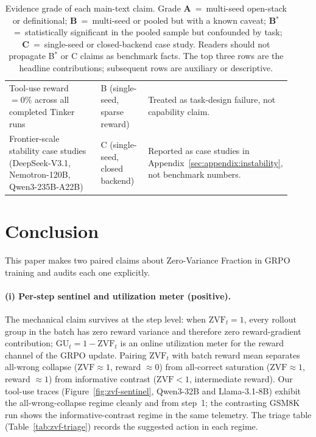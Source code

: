 \documentclass{article}
\begin{document}
\begin{table}[htbp]
\begin{tabular}{p{0.42\linewidth}p{0.18\linewidth}p{0.32\linewidth}}
Tool-use reward $=0\%$ across all completed Tinker runs &
B (single-seed, sparse reward) &
Treated as task-design failure, not capability claim. \\
Frontier-scale stability case studies (DeepSeek-V3.1, Nemotron-120B,
Qwen3-235B-A22B) &
C (single-seed, closed backend) &
Reported as case studies in
Appendix~\ref{sec:appendix:instability}, not benchmark numbers. \\
\bottomrule
\end{tabular}
\caption{Evidence grade of each main-text claim. Grade
\textbf{A}~=~multi-seed open-stack or definitional; \textbf{B}~=~multi-seed
or pooled but with a known caveat; \textbf{B$^{*}$}~=~statistically
significant in the pooled sample but confounded by task; \textbf{C}~=~single-seed
or closed-backend case study. Readers should not propagate B$^{*}$ or C
claims as benchmark facts. The top three rows are the headline contributions;
subsequent rows are auxiliary or descriptive.}
\label{tab:evidence-grade}
\end{table}

\section{Conclusion}
\label{sec:conclusion}

This paper makes two paired claims about Zero-Variance Fraction in GRPO
training and audits each one explicitly.

\paragraph{(i) Per-step sentinel and utilization meter (positive).}
The mechanical claim survives at the step level: when $\mathrm{ZVF}_t = 1$,
every rollout group in the batch has zero reward variance and therefore
zero reward-gradient contribution; $\mathrm{GU}_t = 1-\mathrm{ZVF}_t$ is an
online utilization meter for the reward channel of the GRPO update.
Pairing $\mathrm{ZVF}_t$ with batch reward mean separates all-wrong
collapse ($\mathrm{ZVF}{\approx}1$, reward $\approx 0$) from all-correct
saturation ($\mathrm{ZVF}{\approx}1$, reward $\approx 1$) from informative
contrast ($\mathrm{ZVF}{<}1$, intermediate reward). Our tool-use traces
(Figure~\ref{fig:zvf-sentinel}, Qwen3-32B and Llama-3.1-8B) exhibit the
all-wrong-collapse regime cleanly and from step~1; the contrasting GSM8K
run shows the informative-contrast regime in the same telemetry. The
triage table (Table~\ref{tab:zvf-triage}) records the suggested action in
each regime.
\end{document}
